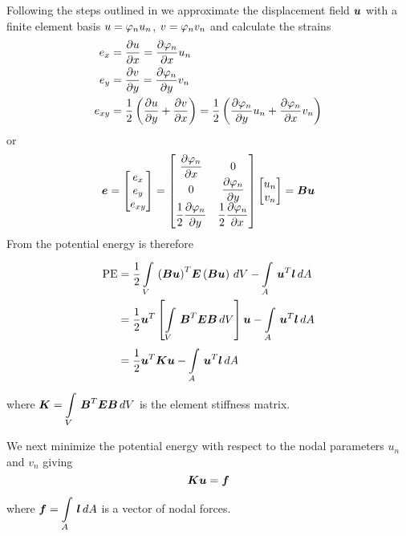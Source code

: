 Following the steps outlined in  we approximate the
displacement field $\boldsymbol{u}$ with a finite element basis $u= \varphi_{n}  u_{n}$,
$v= \varphi_{n}  v_{n}$ and calculate the strains
\begin{gather}
  \begin{aligned}
    e_{x} &=  \dfrac{\partial u}{\partial x}  =  \dfrac{\partial  \varphi_{n} }{\partial x}  u_{n} \\
    e_{y} &=  \dfrac{\partial v}{\partial y}  =  \dfrac{\partial  \varphi_{n} }{\partial y}  v_{n} \\
    e_{xy} &= \dfrac{1}{2}\left(  \dfrac{\partial u}{\partial y} +  \dfrac{\partial v}{\partial x}  \right) = 
    \dfrac{1}{2} \left(  \dfrac{\partial  \varphi_{n} }{\partial y} u_{n} + 
       \dfrac{\partial  \varphi_{n} }{\partial x} v_{n} \right)
  \end{aligned}
  \label{eqn:strains}
\end{gather}
or
\begin{equation}
  \vectr{e} = \begin{bmatrix}
    e_{x} \\
    e_{y} \\
    e_{xy}
    \end{bmatrix} = \begin{bmatrix}
      \delby{\lbfnsymb{n}}{x} & 0 \\
      0 & \delby{\lbfnsymb{n}}{y} \\
      \dfrac{1}{2}\delby{\lbfnsymb{n}}{y} & \dfrac{1}{2}\delby{\lbfnsymb{n}}{x}
  \end{bmatrix} \begin{bmatrix}
    u_{n} \\
    v_{n} 
  \end{bmatrix} = \matr{B}\vectr{u}
  \label{eqn:orstr}
\end{equation}
From  the potential energy is therefore
\begin{align*}
  \text{PE} &= \dfrac{1}{2}
  \goneint{\transpose{\pbrac{\matr{B}\vectr{u}}}\matr{E}\pbrac{\matr{B}\vectr{u}}}{V} -
  \goneint{\transpose{\vectr{u}}\vectr{l}}{A} \\ 
  &= \dfrac{1}{2}\transpose{\vectr{u}} \left[
  \goneint{\transpose{\matr{B}}\matr{E}\matr{B}}{V} \right] \vectr{u} - 
  \goneint{\transpose{\vectr{u}}\vectr{l}}{A} \\
  &= \dfrac{1}{2} \transpose{\vectr{u}}\matr{K}\vectr{u}-
  \goneint{\transpose{\vectr{u}}\vectr{l}}{A}
\end{align*}
where $\matr{K} = \goneint{\transpose{\matr{B}}\matr{E}\matr{B}}{V}$ is the
element stiffness matrix.

We next minimize the potential energy with respect to the nodal parameters
$u_{n}$ and $v_{n}$ giving
\begin{equation}
  \matr{K}\vectr{u} = \vectr{f}
  \label{eqn:pennodpam}
\end{equation}
where $\boldsymbol{f} =    \displaystyle\int\limits_{A}^{} \,\boldsymbol{l}\,dA  $ is a vector of nodal forces.

